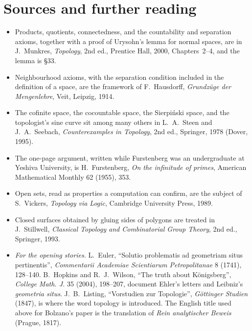 \section*{Sources and further reading}

\begin{itemize}
\item Products, quotients, connectedness, and the countability and separation axioms, together with a proof of Urysohn's lemma for normal spaces, are in J.~Munkres, \emph{Topology}, 2nd ed., Prentice Hall, 2000, Chapters~2--4, and the lemma is \S33.
\item Neighbourhood axioms, with the separation condition included in the definition of a space, are the framework of F.~Hausdorff, \emph{Grundz\"uge der Mengenlehre}, Veit, Leipzig, 1914.
\item The cofinite space, the cocountable space, the Sierpi\'nski space, and the topologist's sine curve sit among many others in L.~A.~Steen and J.~A.~Seebach, \emph{Counterexamples in Topology}, 2nd ed., Springer, 1978 (Dover, 1995).
\item The one-page argument, written while Furstenberg was an undergraduate at Yeshiva University, is H.~Furstenberg, \emph{On the infinitude of primes}, American Mathematical Monthly 62 (1955), 353.
\item Open sets, read as properties a computation can confirm, are the subject of S.~Vickers, \emph{Topology via Logic}, Cambridge University Press, 1989.
\item Closed surfaces obtained by gluing sides of polygons are treated in J.~Stillwell, \emph{Classical Topology and Combinatorial Group Theory}, 2nd ed., Springer, 1993.
\item \emph{For the opening stories.} L.~Euler, ``Solutio problematis ad geometriam situs pertinentis'', \emph{Commentarii Academiae Scientiarum Petropolitanae} 8 (1741), 128--140. B.~Hopkins and R.~J.~Wilson, ``The truth about K\"onigsberg'', \emph{College Math. J.} 35 (2004), 198--207, document Ehler's letters and Leibniz's \emph{geometria situs}. J.~B.~Listing, ``Vorstudien zur Topologie'', \emph{G\"ottinger Studien} (1847), is where the word topology is introduced. The English title used above for Bolzano's paper is the translation of \emph{Rein analytischer Beweis} (Prague, 1817).
\end{itemize}
